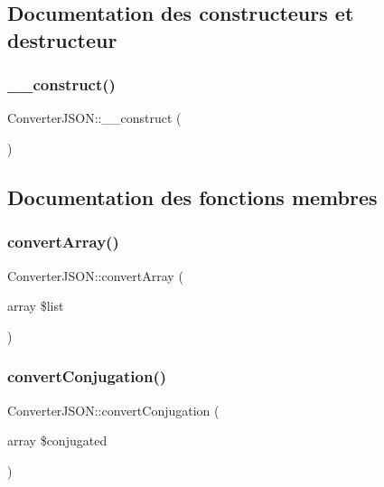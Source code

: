 \subsection{Documentation des constructeurs et destructeur}
\hypertarget{class_converter_j_s_o_n_a133b135a9dd4246877f53fdd326c3c96}{}\label{class_converter_j_s_o_n_a133b135a9dd4246877f53fdd326c3c96} 
\subsubsection{\texorpdfstring{\+\_\+\+\_\+construct()}{\_\_construct()}}
{\footnotesize\ttfamily Converter\+J\+S\+O\+N\+::\+\_\+\+\_\+construct (\begin{DoxyParamCaption}{ }\end{DoxyParamCaption})}



\subsection{Documentation des fonctions membres}
\hypertarget{class_converter_j_s_o_n_a3ed7ca94bfa42fdb952bcb360a7fd4ae}{}\label{class_converter_j_s_o_n_a3ed7ca94bfa42fdb952bcb360a7fd4ae} 
\subsubsection{\texorpdfstring{convert\+Array()}{convertArray()}}
{\footnotesize\ttfamily Converter\+J\+S\+O\+N\+::convert\+Array (\begin{DoxyParamCaption}\item[{array}]{\$list }\end{DoxyParamCaption})}

\hypertarget{class_converter_j_s_o_n_a245ad3051426af9af7cbc251642f0c90}{}\label{class_converter_j_s_o_n_a245ad3051426af9af7cbc251642f0c90} 
\subsubsection{\texorpdfstring{convert\+Conjugation()}{convertConjugation()}}
{\footnotesize\ttfamily Converter\+J\+S\+O\+N\+::convert\+Conjugation (\begin{DoxyParamCaption}\item[{array}]{\$conjugated }\end{DoxyParamCaption})}

